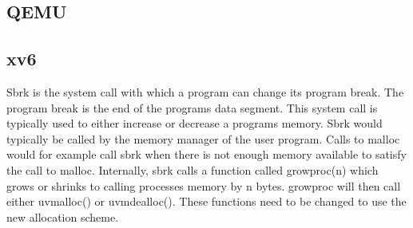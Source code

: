 \subsection{QEMU}



\subsection{xv6}
Sbrk is the system call with which a program can change its program break. The program break
is the end of the programs data segment. This system call is typically used to either
increase or decrease a programs memory.
Sbrk would typically be called by the memory manager of the user program. Calls
to malloc would for example call sbrk when there is not enough memory available to
satisfy the call to malloc.
Internally, sbrk calls a function called growproc(n) which grows or shrinks to calling
processes memory by n bytes.
growproc will then call either uvmalloc() or uvmdealloc(). These functions need to be
changed to use the new allocation scheme.

